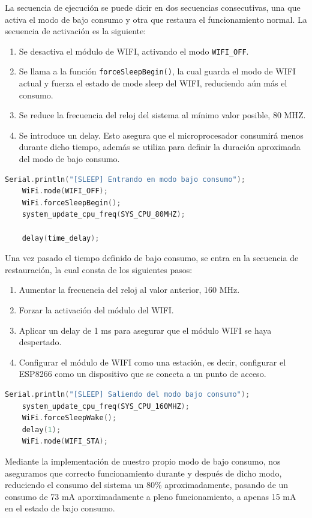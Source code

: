 La secuencia de ejecución se puede dicir en dos secuencias consecutivas, una que activa el modo de bajo consumo y otra que restaura el funcionamiento normal. La secuencia de activación es la siguiente:

\begin{enumerate}
    \item Se desactiva el módulo de WIFI, activando el modo \texttt{WIFI\_OFF}.
    \item Se llama a la función \texttt{forceSleepBegin()}, la cual guarda el modo de WIFI actual y fuerza el estado de mode sleep del WIFI, reduciendo aún más el consumo.
    \item Se reduce la frecuencia del reloj del sistema al mínimo valor posible, 80 MHZ.
    \item Se introduce un delay. Esto asegura que el microprocesador consumirá menos durante dicho tiempo, además se utiliza para definir la duración aproximada del modo de bajo consumo.
\end{enumerate}

\begin{lstlisting}[captionpos=b, caption={Activación modo bajo consumo}, language=c++]
    Serial.println("[SLEEP] Entrando en modo bajo consumo");
    WiFi.mode(WIFI_OFF);
    WiFi.forceSleepBegin();
    system_update_cpu_freq(SYS_CPU_80MHZ);

    delay(time_delay);
\end{lstlisting}

Una vez pasado el tiempo definido de bajo consumo, se entra en la secuencia de restauración, la cual consta de los siguientes pasos:

\begin{enumerate}
    \item Aumentar la frecuencia del reloj al valor anterior, 160 MHz.
    \item Forzar la activación del módulo del WIFI.
    \item Aplicar un delay de 1 ms para asegurar que el módulo WIFI se haya despertado.
    \item Configurar el módulo de WIFI como una estación, es decir, configurar el ESP8266 como un dispositivo que se conecta a un punto de acceso.
\end{enumerate}

\begin{lstlisting}[captionpos=b, caption={Restauración modo bajo consumo}, language=c++]
    Serial.println("[SLEEP] Saliendo del modo bajo consumo");
    system_update_cpu_freq(SYS_CPU_160MHZ);
    WiFi.forceSleepWake();
    delay(1);
    WiFi.mode(WIFI_STA);
\end{lstlisting}

Mediante la implementación de nuestro propio modo de bajo consumo, nos aseguramos que correcto funcionamiento durante y después de dicho modo, reduciendo el consumo del sistema un 80\% aproximadamente, pasando de un consumo de 73 mA aporximadamente a pleno funcionamiento, a apenas 15 mA en el estado de bajo consumo.
